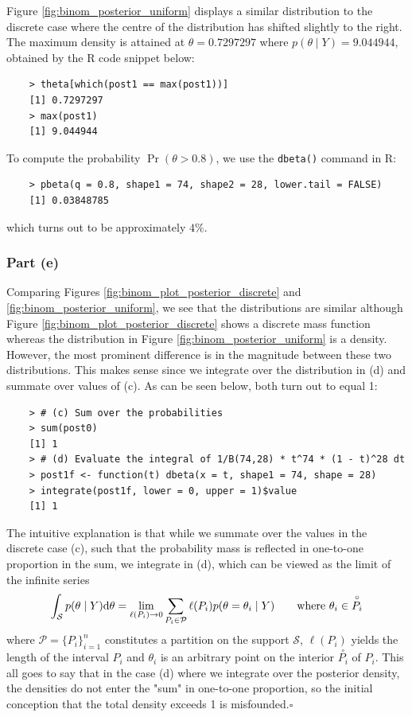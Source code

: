 \documentclass{report}
\begin{document}
Figure \ref{fig:binom_posterior_uniform} displays a similar distribution to the discrete case where the centre of the distribution has shifted slightly to the right.
The maximum density is attained at $\theta = 0.7297297$ where $p(\theta \mid Y) = 9.044944$, obtained by the \textsf{R} code snippet below:
\begin{verbatim}
    > theta[which(post1 == max(post1))]
    [1] 0.7297297
    > max(post1)
    [1] 9.044944
\end{verbatim}
To compute the probability $\Pr(\theta > 0.8)$, we use the \texttt{dbeta()} command in \textsf{R}:
\begin{verbatim}
    > pbeta(q = 0.8, shape1 = 74, shape2 = 28, lower.tail = FALSE)
    [1] 0.03848785
\end{verbatim}
which turns out to be approximately $4\%$.

\subsubsection*{Part (e)}
Comparing Figures \ref{fig:binom_plot_posterior_discrete} and \ref{fig:binom_posterior_uniform}, we see that the distributions are similar although Figure \ref{fig:binom_plot_posterior_discrete} shows a discrete mass function whereas the distribution in Figure \ref{fig:binom_posterior_uniform} is a density. However, the most prominent difference is in the magnitude between these two distributions. This makes sense since we integrate over the distribution in (d) and summate over values of (c). As can be seen below, both turn out to equal 1:
\begin{verbatim}
    > # (c) Sum over the probabilities
    > sum(post0)
    [1] 1
    > # (d) Evaluate the integral of 1/B(74,28) * t^74 * (1 - t)^28 dt
    > post1f <- function(t) dbeta(x = t, shape1 = 74, shape = 28)
    > integrate(post1f, lower = 0, upper = 1)$value
    [1] 1
\end{verbatim}
The intuitive explanation is that while we summate over the values in the discrete case (c), such that the probability mass is reflected in one-to-one proportion in the sum, we integrate in (d), which can be viewed as the limit of the infinite series
\[
\int_{\mathcal S} p(\theta \mid Y) \mathrm{d}\theta = \lim_{\ell(P_i) \to 0} \sum_{P_i \in \mathcal{P}} \ell(P_i) p(\theta = \theta_i \mid Y) \tag*{where \(\theta_i \in \overset{\circ}{P_i}\)}
\]
where $\mathcal P = \{P_i\}_{i = 1}^n$ constitutes a partition on the support $\mathcal S$, $\ell(P_i)$ yields the length of the interval $P_i$ and $\theta_i$ is an arbitrary point on the interior $\overset{\circ}{P_i}$ of $P_i$. This all goes to say that in the case (d) where we integrate over the posterior density, the densities do not enter the "sum" in one-to-one proportion, so the initial conception that the total density exceeds 1 is misfounded.\hfill\(\square\)
\end{document}
